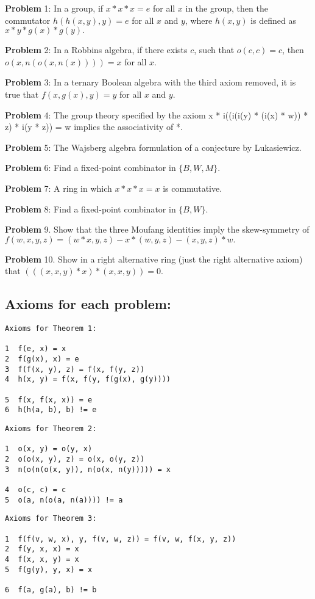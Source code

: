 {\bf Problem} 1: In a group, if $x * x * x = e$ for all $x$ in the group, then
the commutator $h(h(x, y), y) = e$ for all $x$ and $y$, where $h(x, y)$ is defined
as $x * y * g(x) * g(y).$

{\bf Problem} 2: In a Robbins algebra, if there exists $c$, such that
$o(c, c) = c$, then $o(x, n(o(x, n(x)))) = x$ for all $x$.

{\bf Problem} 3: In a ternary Boolean algebra with the third axiom removed,
it is true that $f(x, g(x), y) = y$ for all $x$ and $y$.

{\bf Problem} 4: The group theory specified by the axiom 
x * i((i(i(y) * (i(x) * w)) * z) * i(y * z)) = w 
implies the associativity of *.

{\bf Problem} 5: The Wajsberg algebra formulation of a conjecture by
Lukasiewicz.
    
{\bf Problem} 6: Find a fixed-point combinator in $\{B,W,M\}$.
           
{\bf Problem} 7:  A ring in which $x * x * x = x$ is commutative.

{\bf Problem} 8: Find a fixed-point combinator in $\{B,W\}$.
          
{\bf Problem} 9.
	Show that the three Moufang identities imply the
	skew-symmetry of $f(w,x,y,z) = (w*x,y,z) - x*(w,y,z) - (x,y,z)*w.$

{\bf Problem} 10.  Show in a right alternative ring (just the right
alternative axiom) that $(((x,x,y)*x)*(x,x,y)) = 0$.

\subsection*{Axioms for each problem:}

\begin{verbatim}
Axioms for Theorem 1: 

1  f(e, x) = x
2  f(g(x), x) = e
3  f(f(x, y), z) = f(x, f(y, z))
4  h(x, y) = f(x, f(y, f(g(x), g(y))))

5  f(x, f(x, x)) = e
6  h(h(a, b), b) != e
\end{verbatim}

\begin{verbatim}
Axioms for Theorem 2:

1  o(x, y) = o(y, x)
2  o(o(x, y), z) = o(x, o(y, z))
3  n(o(n(o(x, y)), n(o(x, n(y))))) = x

4  o(c, c) = c
5  o(a, n(o(a, n(a)))) != a
\end{verbatim}

\begin{verbatim}
Axioms for Theorem 3:

1  f(f(v, w, x), y, f(v, w, z)) = f(v, w, f(x, y, z))
2  f(y, x, x) = x
4  f(x, x, y) = x
5  f(g(y), y, x) = x

6  f(a, g(a), b) != b
\end{verbatim}

